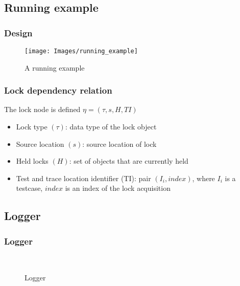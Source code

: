 \documentclass{beamer}
\begin{document}
\subsection{Running example}
\begin{frame}
\frametitle{Design}
\begin{figure}[ht!]
     \begin{center}
%
       
      \texttt{[image: Images/running\_example]}
        
%
    \end{center}
    \caption{%
        A running example
     }%
   \label{fig:subfigures}
\end{figure}
\end{frame}

\begin{frame}
\frametitle{Lock dependency relation}
The lock node is defined $\eta = (\tau, s, H, TI) $
\begin{itemize}
\item Lock type $(\tau)$: data type of the lock object
\item Source location $(s)$: source location of lock
\item Held locks $(H)$: set of objects that are currently held
\item Test and trace location identifier (TI): pair $(I_i, index)$, where $I_i$ is a testcase, $index$ is an index of the lock acquisition
\end{itemize}
\end{frame}

\subsection{Logger}
\begin{frame}
\frametitle{Logger}
\begin{figure}[ht!]
     \begin{center}
%
       
        \\ %
        
%
    \end{center}
    \caption{%
        Logger
     }%
   \label{fig:subfigures}
\end{figure}
\end{frame}
\end{document}

